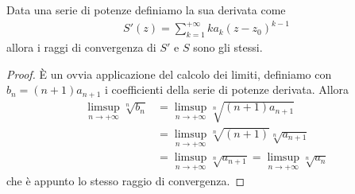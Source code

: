 \begin{theorem}
	\label{prop:invarianza-raggio-convergenza-derivata}
	Data una serie di potenze definiamo la sua derivata come 
	\begin{equation}
	\begin{aligned}
		S'(z) = \sum^{+\infty}_{k=1} ka_k(z-z_0)^{k-1}
	\end{aligned}
	\end{equation} 
	allora i raggi di convergenza di $S'$ e $S$ sono gli stessi.
\end{theorem}
\begin{proof}
	È un ovvia applicazione del calcolo dei limiti, definiamo con $b_n = (n+1)a_{n+1}$ i coefficienti della serie di potenze derivata. Allora 
	\begin{equation}
	\begin{aligned}
		\limsup_{n\to+\infty} \sqrt[n]{b_n} & = \limsup_{n\to+\infty} \sqrt[n]{(n+1)a_{n+1}} \\
											& = \limsup_{n\to+\infty} \sqrt[n]{(n+1)} \sqrt[n]{a_{n+1}} \\
											& = \limsup_{n\to+\infty} \sqrt[n]{a_{n+1}} = \limsup_{n\to+\infty} \sqrt[n]{a_{n}} 
	\end{aligned}
	\end{equation}
	che è appunto lo stesso raggio di convergenza.
\end{proof}

